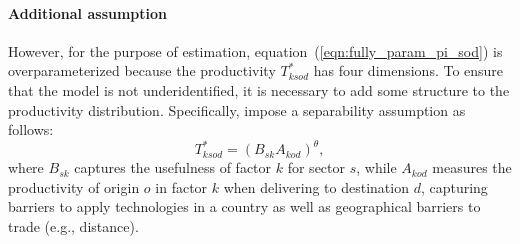 \paragraph{Additional assumption}
However, for the purpose of estimation, equation~(\ref{eqn:fully_param_pi_sod}) 
is overparameterized because the productivity $T_{ksod}^*$ has four dimensions.
To ensure that the model is not underidentified, 
it is necessary to add some structure to the productivity distribution.
Specifically, \cite{Lind:2023} impose a separability assumption as follows:
\begin{equation}
    T_{ksod}^* = \left( B_{sk} A_{kod} \right)^\theta,
\end{equation}
where $B_{sk}$ captures the usefulness of factor $k$ for sector $s$, while $A_{kod}$ 
measures the productivity of origin $o$ in factor $k$ when delivering to destination $d$, 
capturing barriers to apply technologies in a country as well as geographical barriers to trade (e.g., distance).